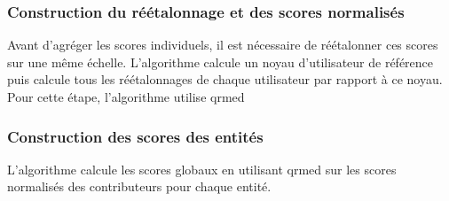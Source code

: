 \subsubsection{Construction du réétalonnage et des scores normalisés}

Avant d'agréger les scores individuels, il est nécessaire de réétalonner ces scores sur une même échelle. L'algorithme calcule un noyau d'utilisateur de référence puis calcule tous les réétalonnages de chaque utilisateur par rapport à ce noyau. Pour cette étape, l'algorithme utilise \gls{qrmed}

\subsubsection{Construction des scores des entités}

L'algorithme calcule les scores globaux en utilisant \gls{qrmed} sur les scores normalisés des contributeurs pour chaque entité.


\pagebreak


